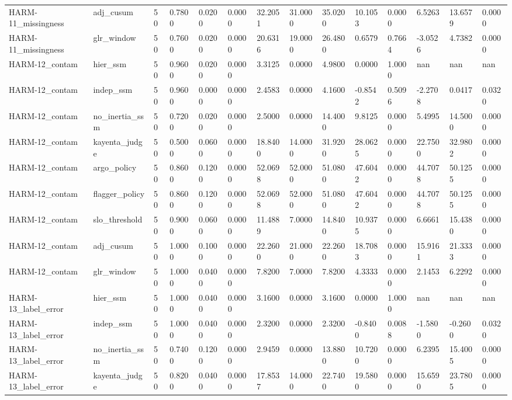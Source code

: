 \begin{table}[htbp]
\begin{tabular}{llllllllllllll}
HARM-11\_missingness & adj\_cusum & 50 & 0.7800 & 0.0200 & 0.0000 & 32.2051 & 31.0000 & 35.0200 & 10.1053 & 0.0000 & 6.5263 & 13.6579 & 0.0000 \\
HARM-11\_missingness & glr\_window & 50 & 0.7600 & 0.0200 & 0.0000 & 20.6316 & 19.0000 & 26.4800 & 0.6579 & 0.7664 & -3.0526 & 4.7382 & 0.0000 \\
HARM-12\_contam & hier\_ssm & 50 & 0.9600 & 0.0200 & 0.0000 & 3.3125 & 0.0000 & 4.9800 & 0.0000 & 1.0000 & nan & nan & nan \\
HARM-12\_contam & indep\_ssm & 50 & 0.9600 & 0.0000 & 0.0000 & 2.4583 & 0.0000 & 4.1600 & -0.8542 & 0.5096 & -2.2708 & 0.0417 & 0.0320 \\
HARM-12\_contam & no\_inertia\_ssm & 50 & 0.7200 & 0.0200 & 0.0000 & 2.5000 & 0.0000 & 14.4000 & 9.8125 & 0.0000 & 5.4995 & 14.5000 & 0.0000 \\
HARM-12\_contam & kayenta\_judge & 50 & 0.5000 & 0.0600 & 0.0000 & 18.8400 & 14.0000 & 31.9200 & 28.0625 & 0.0000 & 22.7500 & 32.9802 & 0.0000 \\
HARM-12\_contam & argo\_policy & 50 & 0.8600 & 0.1200 & 0.0000 & 52.0698 & 52.0000 & 51.0800 & 47.6042 & 0.0000 & 44.7078 & 50.1255 & 0.0000 \\
HARM-12\_contam & flagger\_policy & 50 & 0.8600 & 0.1200 & 0.0000 & 52.0698 & 52.0000 & 51.0800 & 47.6042 & 0.0000 & 44.7078 & 50.1255 & 0.0000 \\
HARM-12\_contam & slo\_threshold & 50 & 0.9000 & 0.0600 & 0.0000 & 11.4889 & 7.0000 & 14.8400 & 10.9375 & 0.0000 & 6.6661 & 15.4380 & 0.0000 \\
HARM-12\_contam & adj\_cusum & 50 & 1.0000 & 0.1000 & 0.0000 & 22.2600 & 21.0000 & 22.2600 & 18.7083 & 0.0000 & 15.9161 & 21.3333 & 0.0000 \\
HARM-12\_contam & glr\_window & 50 & 1.0000 & 0.0400 & 0.0000 & 7.8200 & 7.0000 & 7.8200 & 4.3333 & 0.0000 & 2.1453 & 6.2292 & 0.0000 \\
HARM-13\_label\_error & hier\_ssm & 50 & 1.0000 & 0.0400 & 0.0000 & 3.1600 & 0.0000 & 3.1600 & 0.0000 & 1.0000 & nan & nan & nan \\
HARM-13\_label\_error & indep\_ssm & 50 & 1.0000 & 0.0400 & 0.0000 & 2.3200 & 0.0000 & 2.3200 & -0.8400 & 0.0088 & -1.5800 & -0.2600 & 0.0320 \\
HARM-13\_label\_error & no\_inertia\_ssm & 50 & 0.7400 & 0.1200 & 0.0000 & 2.9459 & 0.0000 & 13.8800 & 10.7200 & 0.0000 & 6.2395 & 15.4005 & 0.0000 \\
HARM-13\_label\_error & kayenta\_judge & 50 & 0.8200 & 0.0400 & 0.0000 & 17.8537 & 14.0000 & 22.7400 & 19.5800 & 0.0000 & 15.6590 & 23.7805 & 0.0000 \\

\end{tabular}
\end{table}
